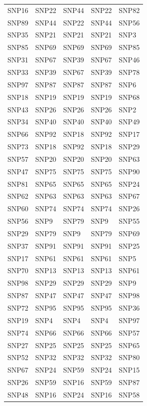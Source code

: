 \begin{table}[ht]
\begin{tabular}{lllll}
  SNP16 & SNP22 & SNP44 & SNP22 & SNP82 \\ 
  SNP89 & SNP44 & SNP22 & SNP44 & SNP56 \\ 
  SNP35 & SNP21 & SNP21 & SNP21 & SNP3 \\ 
  SNP85 & SNP69 & SNP69 & SNP69 & SNP85 \\ 
  SNP31 & SNP67 & SNP39 & SNP67 & SNP46 \\ 
  SNP33 & SNP39 & SNP67 & SNP39 & SNP78 \\ 
  SNP97 & SNP87 & SNP87 & SNP87 & SNP6 \\ 
  SNP18 & SNP19 & SNP19 & SNP19 & SNP68 \\ 
  SNP43 & SNP26 & SNP26 & SNP26 & SNP2 \\ 
  SNP34 & SNP40 & SNP40 & SNP40 & SNP49 \\ 
  SNP66 & SNP92 & SNP18 & SNP92 & SNP17 \\ 
  SNP73 & SNP18 & SNP92 & SNP18 & SNP29 \\ 
  SNP57 & SNP20 & SNP20 & SNP20 & SNP63 \\ 
  SNP47 & SNP75 & SNP75 & SNP75 & SNP90 \\ 
  SNP81 & SNP65 & SNP65 & SNP65 & SNP24 \\ 
  SNP62 & SNP63 & SNP63 & SNP63 & SNP67 \\ 
  SNP60 & SNP74 & SNP74 & SNP74 & SNP26 \\ 
  SNP56 & SNP9 & SNP79 & SNP9 & SNP55 \\ 
  SNP29 & SNP79 & SNP9 & SNP79 & SNP69 \\ 
  SNP37 & SNP91 & SNP91 & SNP91 & SNP25 \\ 
  SNP17 & SNP61 & SNP61 & SNP61 & SNP5 \\ 
  SNP70 & SNP13 & SNP13 & SNP13 & SNP61 \\ 
  SNP98 & SNP29 & SNP29 & SNP29 & SNP9 \\ 
  SNP87 & SNP47 & SNP47 & SNP47 & SNP98 \\ 
  SNP72 & SNP95 & SNP95 & SNP95 & SNP36 \\ 
  SNP19 & SNP4 & SNP4 & SNP4 & SNP97 \\ 
  SNP74 & SNP66 & SNP66 & SNP66 & SNP57 \\ 
  SNP27 & SNP25 & SNP25 & SNP25 & SNP65 \\ 
  SNP52 & SNP32 & SNP32 & SNP32 & SNP80 \\ 
  SNP67 & SNP24 & SNP59 & SNP24 & SNP15 \\ 
  SNP26 & SNP59 & SNP16 & SNP59 & SNP87 \\ 
  SNP48 & SNP16 & SNP24 & SNP16 & SNP58 \\ 

\end{tabular}
\end{table}
